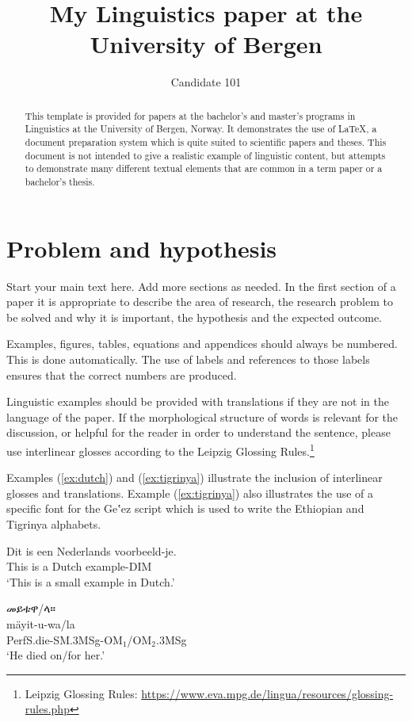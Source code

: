 \documentclass[a4paper,12pt]{article}
\title{My Linguistics paper at the University of Bergen} %
\author{Candidate 101} %
\newcommand{\tig}[1] {\fontspec{Abyssinica SIL} #1} %
\begin{document}
 \maketitle

\begin{abstract} \noindent
This template is provided for papers at the bachelor's and master's programs in Linguistics at the University of Bergen, Norway.
It demonstrates the use of \LaTeX, a document preparation system which is quite suited to scientific papers and theses.
This document is not intended to give a realistic example of linguistic content, but attempts to demonstrate many different textual elements that are common in a term paper or a bachelor's thesis.
\end{abstract}

\section{Problem and hypothesis} \label{sec:intro}
Start your main text here.
Add more sections as needed.
In the first section of a paper it is appropriate to describe the area of research, the research problem to be solved and why it is important, the hypothesis and the expected outcome.

Examples, figures, tables, equations and appendices should always be numbered.
This is done automatically.
The use of labels and references to those labels ensures that the correct numbers are produced.

Linguistic examples should be provided with translations if they are not in the language of the paper.
If the morphological structure of words is relevant for the discussion, or helpful for the reader in order to understand the sentence, please use interlinear glosses according to the Leipzig Glossing Rules.\footnote{Leipzig Glossing Rules: \url{https://www.eva.mpg.de/lingua/resources/glossing-rules.php}}

Examples (\ref{ex:dutch}) and (\ref{ex:tigrinya}) illustrate the inclusion of interlinear glosses and translations.
Example (\ref{ex:tigrinya}) also illustrates the use of a specific font for the Ge‛ez script which is used to write the Ethiopian and Tigrinya alphabets. 

\begin{exe}
\ex \label{ex:dutch}
\gll Dit is een Nederlands voorbeeld-je.\\
This is a Dutch example-DIM\\
\trans `This is a small example in Dutch.'

\ex \label{ex:tigrinya}
\glll \tig{መይቱዋ/ላ።}\\
mäyit-u-wa/la\\
PerfS.die-SM.3MSg-OM$_1$/OM$_2$.3MSg\\ %
\trans ‘He died on/for her.’
\end{exe}
\end{document}
